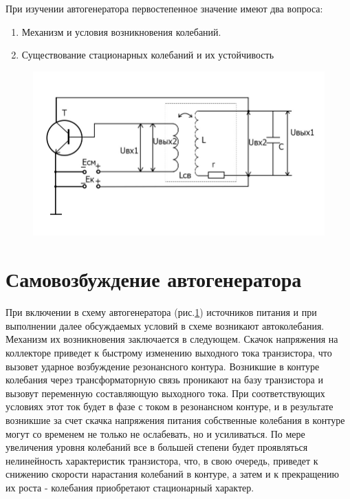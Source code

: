 При изучении автогенератора первостепенное значение имеют два вопроса:
\begin{enumerate}
\item Механизм и условия возникновения колебаний.
\item Существование стационарных колебаний и их устойчивость
\end{enumerate}

\begin{figure}[h]
	\centering
	\includegraphics[width=0.8\linewidth]{circuit/fig2}
	\caption{}
	\label{fig:fig2}
\end{figure}

\section{Самовозбуждение автогенератора}
При включении в схему автогенератора (рис.\ref{fig:fig2}) источников питания и при выполнении далее обсуждаемых условий в схеме возникают автоколебания. Механизм их возникновения заключается в следующем. Скачок напряжения на коллекторе приведет к быстрому изменению выходного тока транзистора, что вызовет ударное возбуждение резонансного контура. Возникшие в контуре колебания через трансформаторную связь проникают на базу транзистора и вызовут переменную составляющую выходного тока. При соответствующих условиях этот ток будет в фазе с током в резонансном контуре, и в результате возникшие за счет скачка напряжения питания собственные колебания в контуре могут со временем не только не ослабевать, но и усиливаться. По мере увеличения уровня колебаний все в большей степени будет проявляться нелинейность характеристик транзистора, что, в свою очередь, приведет к снижению скорости нарастания колебаний в контуре, а затем и к прекращению их роста - колебания приобретают стационарный характер.

